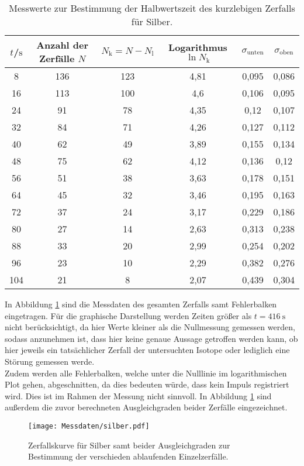 \begin{table}
	\centering
	\caption{Messwerte zur Bestimmung der Halbwertszeit des kurzlebigen Zerfalls für Silber.}
	\label{tab:silver1}
\begin{tabular}{cccccc}
	\toprule
$t$/$\si{\second}$ & Anzahl der Zerfälle $N$&$N_\mathrm{k}=N-N_\mathrm{l}$ & Logarithmus $\ln{N_\mathrm{k}}$&$\sigma_\mathrm{unten}$ &$\sigma_\mathrm{oben}$\\
\midrule
8& 136& 123& 4,81 & 0,095 & 0,086 \\
16& 113& 100& 4,6 & 0,106 & 0,095 \\
24& 91& 78& 4,35 & 0,12 & 0,107 \\
32& 84& 71& 4,26 & 0,127 & 0,112 \\
40& 62& 49& 3,89 & 0,155 & 0,134 \\
48& 75& 62& 4,12 & 0,136 & 0,12 \\
56& 51& 38& 3,63 & 0,178 & 0,151 \\
64& 45& 32& 3,46 & 0,195 & 0,163 \\
72& 37& 24& 3,17 & 0,229 & 0,186 \\
80& 27& 14& 2,63 & 0,313 & 0,238 \\
88& 33& 20& 2,99 & 0,254 & 0,202 \\
96& 23& 10& 2,29 & 0,382 & 0,276 \\
104& 21& 8& 2,07 & 0,439 & 0,304 \\
\bottomrule
\end{tabular}
\end{table}

In Abbildung \ref{fig:silber} sind die Messdaten des gesamten Zerfalls samt Fehlerbalken eingetragen.
Für die graphische Darstellung werden Zeiten größer als $t=\SI{416}{\second}$ nicht berücksichtigt, da hier Werte kleiner als die Nullmessung gemessen werden, sodass anzunehmen ist, dass hier keine genaue Aussage getroffen werden kann, ob hier jeweils ein tatsächlicher Zerfall der untersuchten Isotope oder lediglich eine Störung gemessen werde.\\
Zudem werden alle Fehlerbalken, welche unter die Nulllinie im logarithmischen Plot gehen, abgeschnitten, da dies bedeuten würde, dass kein Impuls registriert wird. Dies ist im Rahmen der Messung nicht sinnvoll.
In Abbildung \ref{fig:silber} sind außerdem die zuvor berechneten Ausgleichgraden beider Zerfälle eingezeichnet.

\begin{figure}
  \centering
  \texttt{[image: Messdaten/silber.pdf]}
  \caption{Zerfallskurve für Silber samt beider Ausgleichgraden zur Bestimmung der verschieden ablaufenden Einzelzerfälle.}
  \label{fig:silber}
\end{figure}

